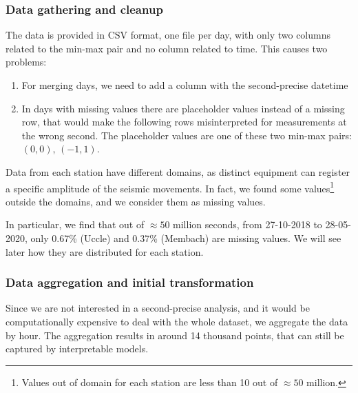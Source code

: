 \documentclass[12pt]{article}
\begin{document}
\subsubsection{Data gathering and cleanup}
The data is provided in CSV format, one file per day, with only two columns related to the min-max pair \cite{Data20200402} and no column related to time. This causes two problems:
\begin{enumerate}[topsep=0.5em,itemsep=0em,partopsep=0.5em]
	\item For merging days, we need to add a column with the second-precise datetime
	\item In days with missing values there are placeholder values instead of a missing row, that would make the following rows misinterpreted for measurements at the wrong second. The placeholder values are one of these two min-max pairs: $(0,0),\, (-1,1)$.
\end{enumerate}

Data from each station have different domains, as distinct equipment can register a specific amplitude of the seismic movements. In fact, we found some values\footnote{Values out of domain for each station are less than 10 out of $\approx50$ million.} outside the domains, and we consider them as missing values.

In particular, we find that out of $\approx50$ million seconds, from 27-10-2018 to 28-05-2020, only 0.67\% (Uccle) and 0.37\% (Membach) are missing values. We will see later how they are distributed for each station.



\subsubsection{Data aggregation and initial transformation}
Since we are not interested in a second-precise analysis, and it would be computationally expensive to deal with the whole dataset, we aggregate the data by hour. The aggregation results in around 14 thousand points, that can still be captured by interpretable models.
\end{document}
